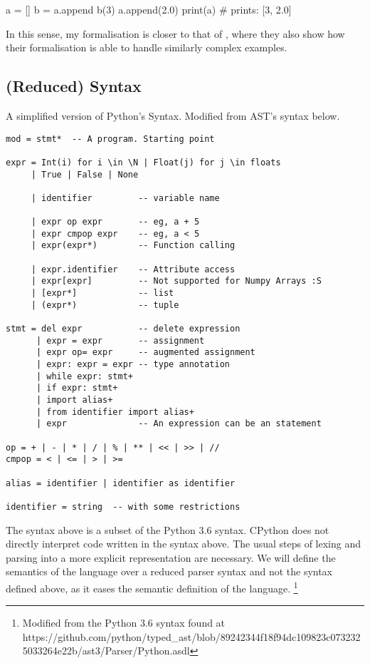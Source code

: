 \begin{pythoncode}
a = []
b = a.append
b(3)
a.append(2.0)
print(a)  # prints: [3, 2.0]
\end{pythoncode}

In this sense, my formalisation is closer to that of
\textcite{politz_python_2013}, where they also show how their
formalisation is able to handle similarly complex examples.

\subsection{(Reduced) Syntax}\label{reduced-syntax}

A simplified version of Python's Syntax. Modified from AST's syntax
below.

{}

\begin{verbatim}
mod = stmt*  -- A program. Starting point

expr = Int(i) for i \in \N | Float(j) for j \in floats
     | True | False | None

     | identifier         -- variable name

     | expr op expr       -- eg, a + 5
     | expr cmpop expr    -- eg, a < 5
     | expr(expr*)        -- Function calling

     | expr.identifier    -- Attribute access
     | expr[expr]         -- Not supported for Numpy Arrays :S
     | [expr*]            -- list
     | (expr*)            -- tuple

stmt = del expr           -- delete expression
      | expr = expr       -- assignment
      | expr op= expr     -- augmented assignment
      | expr: expr = expr -- type annotation
      | while expr: stmt+
      | if expr: stmt+
      | import alias+
      | from identifier import alias+
      | expr              -- An expression can be an statement

op = + | - | * | / | % | ** | << | >> | //
cmpop = < | <= | > | >=

alias = identifier | identifier as identifier

identifier = string  -- with some restrictions
\end{verbatim}

The syntax above is a subset of the Python 3.6 syntax. CPython does not
directly interpret code written in the syntax above. The usual steps of
lexing and parsing into a more explicit representation are necessary. We
will define the semantics of the language over a reduced parser syntax
and not the syntax defined above, as it eases the semantic definition of
the language. \footnote{Modified from the Python 3.6 syntax found at
  https://github.com/python/typed\_ast/blob/89242344f18f94dc109823c0732325033264e22b/ast3/Parser/Python.asdl}

